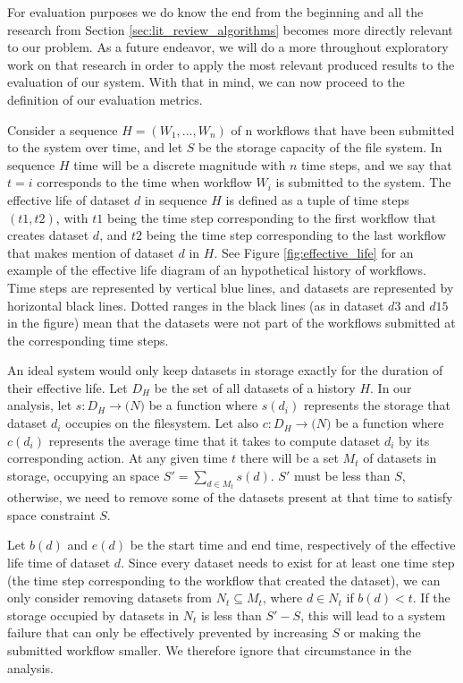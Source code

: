 For evaluation purposes we do know the end from the beginning and all the research from Section \ref{sec:lit_review_algorithms} becomes more directly relevant to our problem.  As a future endeavor, we will do a more throughout exploratory work on that research in order to apply the most relevant produced results to the evaluation of our system.  With that in mind, we can now proceed to the definition of our evaluation metrics.

Consider a sequence $H=(W_1, ..., W_n)$ of n workflows that have been submitted to the system over time, and let $S$ be the storage capacity of the file system.  In sequence $H$ time will be a discrete magnitude with $n$ time steps, and we say that $t = i$ corresponds to the time when workflow $W_i$ is submitted to the system. The effective life of dataset $d$ in sequence $H$ is defined as a tuple of time steps $(t1, t2)$, with $t1$ being the time step corresponding to the first workflow that creates dataset $d$, and  $t2$ being the time step corresponding to the last workflow that makes mention of dataset $d$ in $H$.  See Figure \ref{fig:effective_life} for an example of the effective life diagram of an hypothetical history of workflows.  Time steps are represented by vertical blue lines, and datasets are represented by horizontal black lines.  Dotted ranges in the black lines (as in dataset $d3$ and $d15$ in the figure) mean that the datasets were not part of the workflows submitted at the corresponding time steps.

An ideal system would only keep datasets in storage exactly for the duration of their effective life.  Let $D_H$ be the set of all datasets of a history $H$.  In our analysis, let $s: D_H \to \mathtt(N)$ be a function where $s(d_i)$ represents the storage that dataset $d_i$ occupies on the filesystem.  Let also $c: D_H \to \mathtt(N)$ be a function where $c(d_i)$ represents the average time that it takes to compute dataset $d_i$ by its corresponding action. At any given time $t$ there will be a set $M_t$ of datasets in storage, occupying an space $S' = \sum_{d \in M_t}{s(d)}$.  $S'$ must be less than $S$, otherwise, we need to remove some of the datasets present at that time to satisfy space constraint $S$.

Let $b(d)$ and $e(d)$ be the start time and end time, respectively of the effective life time of dataset $d$.  Since every dataset needs to exist for at least one time step (the time step corresponding to the workflow that created the dataset), we can only consider removing datasets from $N_t \subseteq M_t$, where $d \in N_t$ if $b(d) < t$.  If the storage occupied by datasets in $N_t$ is less than $S' - S$, this will lead to a system failure that can only be effectively prevented by increasing $S$ or making the submitted workflow smaller.  We therefore ignore that circumstance in the analysis.  


